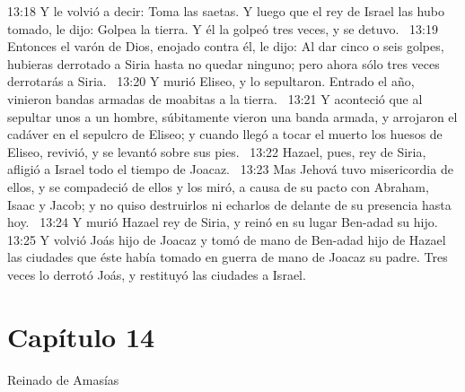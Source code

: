 13:18 Y le volvió a decir: Toma las saetas. Y luego que el rey de Israel las hubo tomado, le dijo: Golpea la tierra. Y él la golpeó tres veces, y se detuvo.  
13:19 Entonces el varón de Dios, enojado contra él, le dijo: Al dar cinco o seis golpes, hubieras derrotado a Siria hasta no quedar ninguno; pero ahora sólo tres veces derrotarás a Siria.  
13:20 Y murió Eliseo, y lo sepultaron. Entrado el año, vinieron bandas armadas de moabitas a la tierra.  
13:21 Y aconteció que al sepultar unos a un hombre, súbitamente vieron una banda armada, y arrojaron el cadáver en el sepulcro de Eliseo; y cuando llegó a tocar el muerto los huesos de Eliseo, revivió, y se levantó sobre sus pies.  
13:22 Hazael, pues, rey de Siria, afligió a Israel todo el tiempo de Joacaz.  
13:23 Mas Jehová tuvo misericordia de ellos, y se compadeció de ellos y los miró, a causa de su pacto con Abraham, Isaac y Jacob; y no quiso destruirlos ni echarlos de delante de su presencia hasta hoy.  
13:24 Y murió Hazael rey de Siria, y reinó en su lugar Ben-adad su hijo.  
13:25 Y volvió Joás hijo de Joacaz y tomó de mano de Ben-adad hijo de Hazael las ciudades que éste había tomado en guerra de mano de Joacaz su padre. Tres veces lo derrotó Joás, y restituyó las ciudades a Israel.  
\section*{Capítulo 14 }
Reinado de Amasías  



